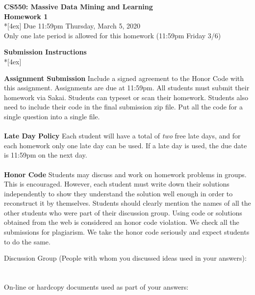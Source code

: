 \documentclass[11pt]{article}
\begin{document}
\thispagestyle{empty}
\parindent 0pt
\vfill
\large

\begin{center}
\LARGE{\bf \textsf{CS550: Massive Data Mining and Learning}}\\ {\bf \textsf{Homework 1}} 
\\*[4ex]
Due 11:59pm Thursday, March 5, 2020\\
Only one late period is allowed for this homework (11:59pm Friday 3/6)
\end{center}

\pagebreak[4]
\begin{center}
\LARGE{\bf \textsf{Submission Instructions}} \\*[4ex]
\end{center}

\textbf{Assignment Submission } Include a signed agreement to the Honor Code with this assignment. Assignments are due at 11:59pm. All students must submit their homework via Sakai. Students can typeset or scan their homework. Students also need to include their code in the final submission zip file. Put all the code for a single question into a single file. 
\\
\\
\textbf{Late Day Policy } Each student will have a total of {\em two} free late days, and for each homework only one late day can be used. If a late day is used, the due date is 11:59pm on the next day.
\\
\\
\textbf{Honor Code } Students may discuss and work on homework problems in groups. This is encouraged. However, each student must write down their solutions independently to show they understand the solution well enough in order to reconstruct it by themselves.  Students should clearly mention the names of all the other students who were part of their discussion group. Using code or solutions obtained from the web is considered an honor code violation. We check all the submissions for plagiarism. We take the honor code seriously and expect students to do the same. 

\vfill
\vfill

Discussion Group (People with whom you discussed ideas used in your answers): \\\\\\
On-line or hardcopy documents used as part of your answers: \\\\\\
\vfill
\end{document}
